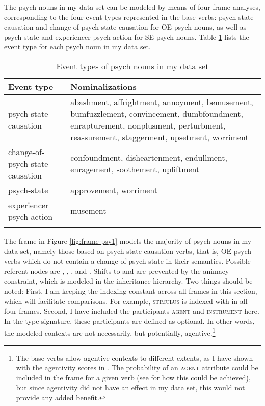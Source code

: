 The psych nouns in my data set can be modeled by means of four frame analyses, corresponding to the four event types represented in the base verbs: psych-state causation and change-of-psych-state causation for OE psych nouns, as well as psych-state and experiencer psych-action for SE psych nouns. Table \ref{tab:psych-nouns} lists the event type for each psych noun in my data set.

\begin{table}
    \caption[Event types of psych nouns in my data set]{\label{tab:psych-nouns}Event types of psych nouns in my data set}
    \begin{tabular}{
        l
        >{\RaggedRight\arraybackslash}p{}
      }
      \lsptoprule
      Event type & Nominalizations \\ 
      \midrule
      psych-state causation & abashment, affrightment, annoyment, bemusement, bumfuzzlement, convincement, dumbfoundment, enrapturement, nonplusment, perturbment, reassurement, staggerment, upsetment, worriment \\
      change-of-psych-state causation & confoundment, disheartenment, endullment, enragement, soothement, upliftment \\
      psych-state & approvement, worriment \\
      experiencer psych-action & musement \\
      \lspbottomrule
    \end{tabular} 
\end{table}

\begin{sloppypar}
The frame in Figure \ref{fig:frame-psy1} models the majority of psych nouns in my data set, namely those based on psych-state causation verbs, that is, OE psych verbs which do not contain a change-of-psych-state in their semantics. 
Possible referent nodes are , , , and . Shifts to  and  are prevented by the animacy constraint, which is modeled in the inheritance hierarchy. 
Two things should be noted: 
First, I am keeping the indexing constant across all frames in this section, which will facilitate comparisons. For example, \textsc{stimulus} is indexed with  in all four frames.   
Second, I have included the participants \textsc{agent} and \textsc{instrument} here. In the type signature, these participants are defined as optional. In other words, the modeled contexts are not necessarily, but potentially, agentive.\footnote{The base verbs allow agentive contexts to different extents, as I have shown with the agentivity scores in . The probability of an \textsc{agent} attribute could be included in the frame for a given verb (see  for how this could be achieved), but since agentivity did not have an effect in my data set, this would not provide any added benefit.}
\end{sloppypar}

